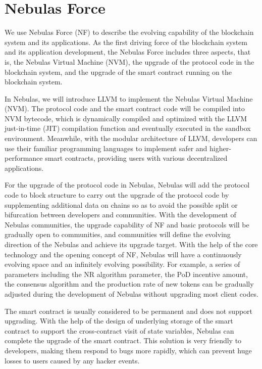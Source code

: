 \section{Nebulas Force}
\label{sec:nebulasforce}

We use Nebulas Force (NF) to describe the evolving capability of the blockchain system and its applications. As the first driving force of the blockchain system and its application development, the Nebulas Force includes three aspects, that is, the Nebulas Virtual Machine (NVM), the upgrade of the protocol code in the blockchain system, and the upgrade of the smart contract running on the blockchain system.

In Nebulas, we will introduce LLVM to implement the Nebulas Virtual Machine (NVM). The protocol code and the smart contract code will be compiled into NVM bytecode, which is dynamically compiled and optimized with the LLVM just-in-time (JIT) compilation function and eventually executed in the sandbox environment. Meanwhile, with the modular architecture of LLVM, developers can use their familiar programming languages to implement safer and higher-performance smart contracts, providing users with various decentralized applications.

For the upgrade of the protocol code in Nebulas, Nebulas will add the protocol code to block structure to carry out the upgrade of the protocol code by supplementing additional data on chains so as to avoid the possible split or bifurcation between developers and communities. With the development of Nebulas communities, the upgrade capability of NF and basic protocols will be gradually open to communities, and communities will define the evolving direction of the Nebulas and achieve its upgrade target. With the help of the core technology and the opening concept of NF, Nebulas will have a continuously evolving space and an infinitely evolving possibility. For example, a series of parameters including the NR algorithm parameter, the PoD incentive amount, the consensus algorithm and the production rate of new tokens can be gradually adjusted during the development of Nebulas without upgrading most client codes.

The smart contract is usually considered to be permanent and does not support upgrading. With the help of the design of underlying storage of the smart contract to support the cross-contract visit of state variables, Nebulas can complete the upgrade of the smart contract. This solution is very friendly to developers, making them respond to bugs more rapidly, which can prevent huge losses to users caused by any hacker events.

